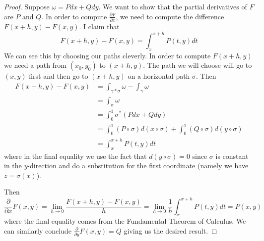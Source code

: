 \begin{proof}
    Suppose $\omega = Pdx + Qdy$. We want to show that the partial derivatives of $F$ are $P$ and $Q$. In order to compute $\frac{\partial F}{\partial x}$, we need to compute the difference $F(x + h, y) - F(x, y)$. I claim that
    $$ F(x + h, y) - F(x, y) = \int_{x}^{x+h} P(t, y) dt $$
    We can see this by choosing our paths cleverly.
    In order to compute $F(x + h, y)$ we need a path from $(x_0, y_0)$ to $(x + h, y)$. The path we will choose will go to $(x, y)$ first and then go to $(x + h, y)$ on a horizontal path $\sigma$. Then
    \begin{align*}
        F(x + h, y) - F(x, y) &= \int_{\gamma * \sigma} \omega - \int_{\gamma} \omega\\
        &= \int_{\sigma} \omega \\
        &= \int_{0}^1 \sigma^*(P dx + Q dy)\\
        &= \int_{0}^1 (P \circ \sigma) d(x \circ \sigma) + \int_0^1 (Q \circ \sigma) d(y \circ \sigma)\\
        &= \int_{x}^{x + h} P(t, y) dt 
    \end{align*}
    where in the final equality we use the fact that $d(y \circ \sigma) = 0$ since $\sigma$ is constant in the $y$-direction and do a substitution for the first coordinate (namely we have $z = \sigma(x)$).
    
    Then 
    $$ \frac{\partial}{\partial x} F(x, y) = \lim_{h \to 0} \frac{F(x + h, y) - F(x, y)}{h} = \lim_{h \to 0} \frac{1}{h} \int_x^{x + h} P(t, y) dt = P(x, y) $$
    where the final equality comes from the Fundamental Theorem of Calculus. We can similarly conclude $\frac{\partial }{\partial y}F(x, y) = Q$ giving us the desired result.
\end{proof}